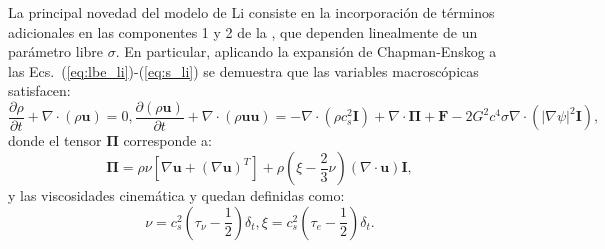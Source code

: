 La principal novedad del modelo de Li consiste en la incorporaci\'on de t\'erminos adicionales en las componentes 1 y 2 de la , que dependen linealmente de un par\'ametro libre $\sigma$. En particular, aplicando la expansi\'on de Chapman-Enskog a las Ecs.~(\ref{eq:lbe_li})-(\ref{eq:s_li}) se demuestra que las variables macrosc\'opicas satisfacen:
\begin{subequations}
	\begin{equation}
		\dfrac{\partial \rho}{\partial t} + \nabla \cdot (\rho \bm{u}) = 0,
	\end{equation}
\begin{equation}
	\dfrac{\partial (\rho \bm{u})}{\partial t} + \nabla \cdot (\rho \bm{uu}) = -\nabla \cdot (\rho c_s^2 \bm{I}) + \nabla \cdot \bm{\Pi} + \bm{F} - 2G^2 c^4 \sigma \nabla \cdot (|\nabla \psi|^2 \bm{I}),	
\end{equation}
\label{eq:li_macro}
\end{subequations}
donde el tensor $\bm{\Pi}$ corresponde a:
\begin{equation}
	\bm{\Pi} = \rho \nu \left[ \nabla \bm{u} + (\nabla \bm{u})^T \right] + \rho \left( \xi - \dfrac{2}{3}\nu \right) (\nabla \cdot \bm{u})\bm{I},
\end{equation}
y las viscosidades cinem\'atica y  quedan definidas como:
\begin{subequations}
	\begin{equation}
		\nu = c_s^2 \left( \tau_{\nu} - \dfrac{1}{2}\right) \delta_t,
	\end{equation}
	\begin{equation}
		\xi = c_s^2 \left( \tau_{e} - \dfrac{1}{2}\right) \delta_t.
	\end{equation}	
\end{subequations}


